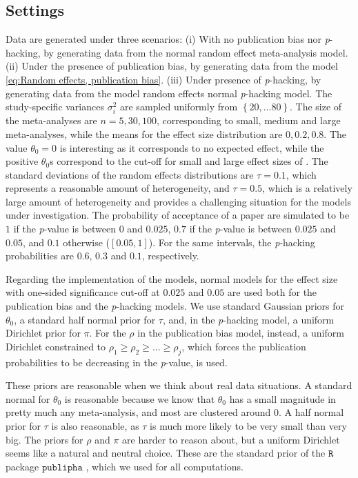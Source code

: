\documentclass[preprint, authoryear]{elsarticle}
\theoremstyle{plain}
\theoremstyle{definition}
\begin{document}
\subsection{Settings}
Data are generated under three scenarios: (i) With no publication bias nor \emph{p}-hacking, by generating data from the normal random effect meta-analysis model. (ii) Under the presence of publication bias, by generating data from the model \eqref{eq:Random effects, publication bias}. (iii) Under presence of \emph{p}-hacking, by generating data from the model random effects normal \emph{p}-hacking model. The study-specific variances $\sigma_{i}^{2}$ are sampled uniformly from $\left\{ 20,\ldots80\right\} $. The size of the meta-analyses are $n = 5, 30, 100$, corresponding to small, medium and large meta-analyses, while the means for the effect size distribution are $0, 0.2, 0.8$. The value $\theta_0 = 0$ is interesting as it corresponds to no expected effect, while the positive $\theta_0$s correspond to the cut-off for small and large effect sizes of \citet[][pages 24 -- 27]{cohen1988statistical}. The standard deviations of the random effects distributions are $\tau=0.1$, which represents a reasonable amount of heterogeneity, and $\tau=0.5$, which is a relatively large amount of heterogeneity and provides a challenging situation for the models under investigation. The probability of acceptance of a paper are simulated to be $1$ if the \emph{p}-value is between $0$ and $0.025$, $0.7$ if the \emph{p}-value is between $0.025$ and $0.05$, and $0.1$ otherwise ($[0.05, 1]$). For the same intervals, the \emph{p}-hacking probabilities are $0.6$, $0.3$ and $0.1$, respectively.

Regarding the implementation of the models, normal models for the effect size with one-sided significance cut-off at $0.025$ and $0.05$ are used both for the publication bias and the \emph{p}-hacking models. We use standard Gaussian priors for $\theta_0$, a standard half normal prior for $\tau$, and, in the \emph{p}-hacking model, a uniform Dirichlet prior for $\pi$. For the $\rho$ in the publication bias model, instead, a uniform Dirichlet constrained to $\rho_{1}\geq\rho_{2}\geq\ldots\geq\rho_{j}$, which forces the publication probabilities to be decreasing in the \emph{p}-value, is used.

These priors are reasonable when we think about real data situations. A standard normal for $\theta_0$ is reasonable because we know that $\theta_0$ has a small magnitude in pretty much any meta-analysis, and most are clustered around $0$. A half normal prior for $\tau$ is also reasonable, as $\tau$ is much more likely to be very small than very big. The priors for $\rho$ and $\pi$ are harder to reason about, but a uniform Dirichlet seems like a natural and neutral choice. These are the standard prior of the $\mathtt{R}$ package $\mathtt{publipha}$ \citep{publipha}, which we used for all computations.
\end{document}
